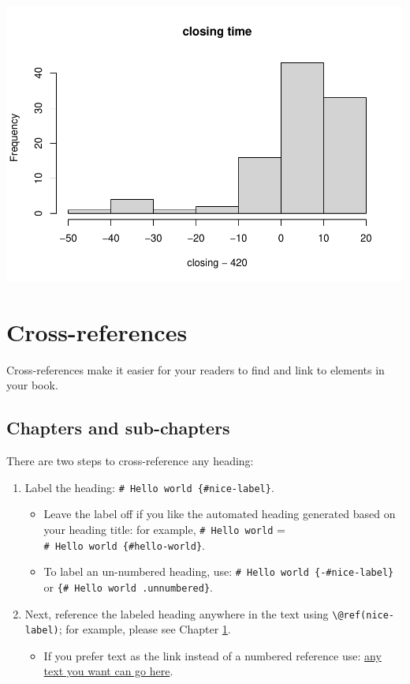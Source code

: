 \documentclass[
]{book}
\providecommand{\tightlist}{%
  \setlength{\itemsep}{0pt}\setlength{\parskip}{0pt}}
\theoremstyle{definition}
\theoremstyle{definition}
\theoremstyle{definition}
\theoremstyle{definition}
\theoremstyle{remark}
\begin{document}
\includegraphics{_main_files/figure-latex/simul-4.pdf}

\hypertarget{cross}{%
\chapter{Cross-references}\label{cross}}

Cross-references make it easier for your readers to find and link to elements in your book.

\hypertarget{chapters-and-sub-chapters}{%
\section{Chapters and sub-chapters}\label{chapters-and-sub-chapters}}

There are two steps to cross-reference any heading:

\begin{enumerate}
\def\labelenumi{\arabic{enumi}.}
\tightlist
\item
  Label the heading: \texttt{\#\ Hello\ world\ \{\#nice-label\}}.

  \begin{itemize}
  \tightlist
  \item
    Leave the label off if you like the automated heading generated based on your heading title: for example, \texttt{\#\ Hello\ world} = \texttt{\#\ Hello\ world\ \{\#hello-world\}}.
  \item
    To label an un-numbered heading, use: \texttt{\#\ Hello\ world\ \{-\#nice-label\}} or \texttt{\{\#\ Hello\ world\ .unnumbered\}}.
  \end{itemize}
\item
  Next, reference the labeled heading anywhere in the text using \texttt{\textbackslash{}@ref(nice-label)}; for example, please see Chapter \ref{cross}.

  \begin{itemize}
  \tightlist
  \item
    If you prefer text as the link instead of a numbered reference use: \protect\hyperlink{cross}{any text you want can go here}.
  \end{itemize}
\end{enumerate}
\end{document}
